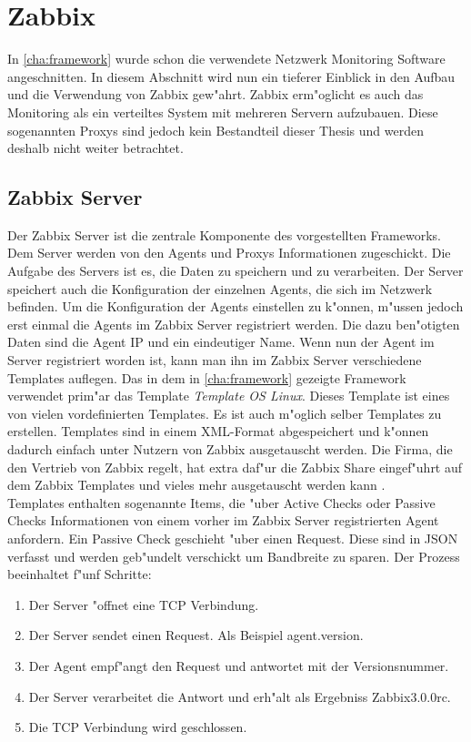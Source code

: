 \chapter{Zabbix}
\label{cha:zabbix}
In \cref{cha:framework} wurde schon die verwendete Netzwerk Monitoring Software angeschnitten. In diesem Abschnitt wird nun %
ein tieferer Einblick in den Aufbau und die Verwendung von Zabbix gew"ahrt. Zabbix erm"oglicht es %
auch das Monitoring als ein verteiltes System mit mehreren Servern aufzubauen. Diese sogenannten Proxys %
sind jedoch kein Bestandteil dieser Thesis und werden deshalb nicht weiter betrachtet.

\section{Zabbix Server}
\label{sec:server}
Der Zabbix Server ist die zentrale Komponente des vorgestellten Frameworks. Dem Server werden von den Agents und Proxys %
Informationen zugeschickt. Die Aufgabe des Servers ist es, die Daten zu speichern und zu verarbeiten. %
Der Server speichert auch die Konfiguration der einzelnen Agents, die sich im Netzwerk befinden. %
Um die Konfiguration der Agents einstellen zu k"onnen, m"ussen jedoch erst einmal die Agents im Zabbix %
Server registriert werden. Die dazu ben"otigten Daten sind die Agent IP und ein eindeutiger Name. %
Wenn nun der Agent im Server registriert worden ist, kann man ihn im Zabbix Server verschiedene Templates auflegen. %
Das in dem in \cref{cha:framework} gezeigte Framework verwendet prim"ar das Template \emph{Template OS %
Linux}. Dieses Template ist eines von vielen vordefinierten Templates. Es ist auch m"oglich selber Templates %
zu erstellen. Templates sind in einem XML-Format abgespeichert und k"onnen dadurch einfach unter Nutzern von Zabbix %
ausgetauscht werden. Die Firma, die den Vertrieb von Zabbix regelt, hat extra daf"ur die Zabbix Share eingef"uhrt %
auf dem Zabbix Templates und vieles mehr ausgetauscht werden kann \autocite{zabbix:share}. \ \\ %
Templates enthalten sogenannte Items, die "uber Active Checks oder Passive Checks Informationen von %
einem vorher im Zabbix Server registrierten Agent anfordern. Ein Passive Check geschieht "uber einen %
Request. Diese sind in JSON verfasst und werden geb"undelt verschickt um Bandbreite zu sparen. %
Der Prozess beeinhaltet f"unf Schritte: %
\begin{enumerate}
\item Der Server "offnet eine TCP Verbindung. %
\item Der Server sendet einen Request. Als Beispiel agent.version. %
\item Der Agent empf"angt den Request und antwortet mit der Versionsnummer. %
\item Der Server verarbeitet die Antwort und erh"alt als Ergebniss Zabbix3.0.0rc. %
\item Die TCP Verbindung wird geschlossen. %
\end{enumerate}
